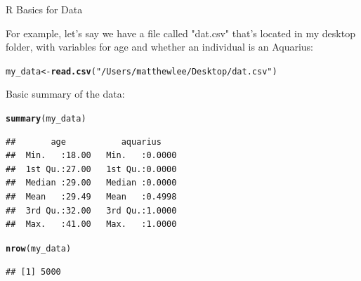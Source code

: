 \documentclass[svgnames,smaller]{beamer}\usepackage[]{graphicx}\usepackage[]{color}
\makeatletter
\newcommand{\hlstr}[1]{\textcolor[rgb]{0.192,0.494,0.8}{#1}}%
\newcommand{\hlstd}[1]{\textcolor[rgb]{0.345,0.345,0.345}{#1}}%
\newcommand{\hlkwb}[1]{\textcolor[rgb]{0.69,0.353,0.396}{#1}}%
\newcommand{\hlkwd}[1]{\textcolor[rgb]{0.737,0.353,0.396}{\textbf{#1}}}%
\newenvironment{kframe}{%
 \def\at@end@of@kframe{}%
 \ifinner\ifhmode%
  \def\at@end@of@kframe{\end{minipage}}%
  \begin{minipage}{\columnwidth}%
 \fi\fi%
 \def\FrameCommand##1{\hskip\@totalleftmargin \hskip-\fboxsep
 \colorbox{shadecolor}{##1}\hskip-\fboxsep
     \hskip-\linewidth \hskip-\@totalleftmargin \hskip\columnwidth}%
 \MakeFramed {\advance\hsize-\width
   \@totalleftmargin\z@ \linewidth\hsize
   \@setminipage}}%
 {\par\unskip\endMakeFramed%
 \at@end@of@kframe}
\newenvironment{knitrout}{}{} %
\makeatother
\begin{document}

\begin{frame}[fragile]{R Basics for Data}

For example, let's say we have a file called "dat.csv" that's located in my desktop folder, with variables for age and whether an individual is an Aquarius:


\begin{knitrout}\scriptsize
{}\color{fgcolor}\begin{kframe}
\begin{alltt}
\hlstd{my_data} \hlkwb{<-} \hlkwd{read.csv}\hlstd{(}\hlstr{"/Users/matthewlee/Desktop/dat.csv"}\hlstd{)}
\end{alltt}
\end{kframe}
\end{knitrout}

Basic summary of the data:
\begin{knitrout}\scriptsize
{}\color{fgcolor}\begin{kframe}
\begin{alltt}
\hlkwd{summary}\hlstd{(my_data)}
\end{alltt}
\begin{verbatim}
##       age           aquarius     
##  Min.   :18.00   Min.   :0.0000  
##  1st Qu.:27.00   1st Qu.:0.0000  
##  Median :29.00   Median :0.0000  
##  Mean   :29.49   Mean   :0.4998  
##  3rd Qu.:32.00   3rd Qu.:1.0000  
##  Max.   :41.00   Max.   :1.0000
\end{verbatim}
\begin{alltt}
\hlkwd{nrow}\hlstd{(my_data)}
\end{alltt}
\begin{verbatim}
## [1] 5000
\end{verbatim}
\end{kframe}
\end{knitrout}


\end{frame}



\end{document}
